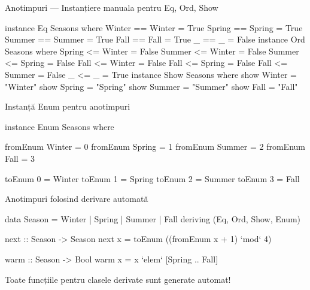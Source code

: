 \documentclass[xcolor=pdftex,romanian,colorlinks]{beamer}
\begin{document}
\begin{frame}[fragile]{Anotimpuri --- Instanțiere manuala pentru Eq, Ord, Show}
\vspace{-2ex}
\begin{asciihs}
  instance   Eq   Seasons   where
    Winter   ==   Winter    = True
    Spring   ==   Spring    = True
    Summer   ==   Summer    = True
    Fall     ==   Fall      = True
    _        ==   _         = False
  instance   Ord Seasons where
    Spring   <= Winter = False
    Summer   <= Winter = False
    Summer   <= Spring = False
    Fall     <= Winter = False
    Fall     <= Spring = False
    Fall     <= Summer = False
    _        <= _       = True
  instance Show Seasons where
    show Winter = "Winter"
    show Spring = "Spring"
    show Summer = "Summer"
    show Fall   = "Fall"
\end{asciihs}
\end{frame}

\begin{frame}[fragile]{Instanță Enum pentru anotimpuri}
\begin{asciihs}
  instance Enum Seasons where

    fromEnum     Winter   =    0
    fromEnum     Spring   =    1
    fromEnum     Summer   =    2
    fromEnum     Fall     =    3

    toEnum   0    =   Winter
    toEnum   1    =   Spring
    toEnum   2    =   Summer
    toEnum   3    =   Fall
\end{asciihs}
\end{frame}

\begin{frame}[fragile]{Anotimpuri folosind derivare automată}
\begin{asciihs}
  data Season = Winter | Spring | Summer | Fall
                deriving (Eq, Ord, Show, Enum)

  next :: Season -> Season
  next x = toEnum ((fromEnum x + 1) `mod` 4)

  warm :: Season -> Bool
  warm x = x `elem` [Spring .. Fall]
\end{asciihs}

\vfill
Toate funcțiile pentru clasele derivate sunt generate automat!
\end{frame}
\end{document}
